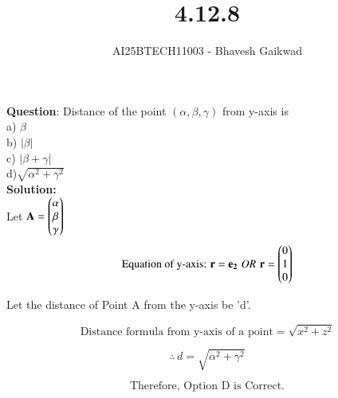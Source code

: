 \documentclass[journal]{IEEEtran}
\begin{document}

\vspace{3cm}

\title{4.12.8}
\author{AI25BTECH11003 - Bhavesh Gaikwad}
{\let\newpage\relax\maketitle}

\renewcommand{\thefigure}{\theenumi}
\renewcommand{\thetable}{\theenumi}
\setlength{\intextsep}{10pt} 


\renewcommand{\thetable}{\theenumi}


\textbf{Question}: Distance of the point $(\alpha, \beta, \gamma)$ from y-axis is\\
a) $\beta$\\
b) $|\beta|$\\
c) $|\beta + \gamma|$\\
d)$\sqrt{\alpha^2 + \gamma^2}$ \\

\textbf{Solution:}\\
Let $\mathbf{A} = \begin{pmatrix}\alpha \\ \beta \\ \gamma\end{pmatrix}$\\ 


\begin{equation}
    \text{Equation of y-axis: } \mathbf{r} = \mathbf{e_2} \, \,
    OR \, \, \mathbf{r}=\begin{pmatrix}0 \\ 1 \\ 0\end{pmatrix}
\end{equation}

Let the distance of Point A from the y-axis be 'd'.

\begin{equation}
    \text{Distance formula from y-axis of a point} = \sqrt{x^2 + z^2} 
\end{equation} 

\begin{equation}
\therefore \, d = \sqrt{\alpha^2 + \gamma^2}    
\end{equation}

\begin{equation}
\boxed{\text{Therefore, Option D is Correct.}}    
\end{equation}

\newpage
\end{document}

